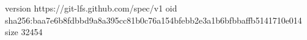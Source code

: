 version https://git-lfs.github.com/spec/v1
oid sha256:baa7e6b8fdbbd9a8a395cc81b0c76a154bfebb2e3a1b6bfbbaffb5141710e014
size 32454
